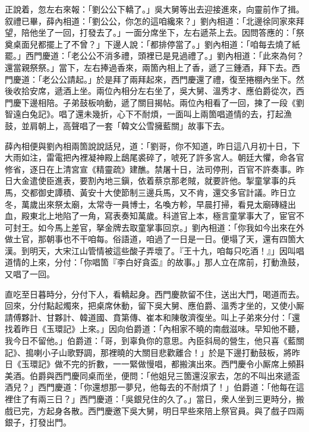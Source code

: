 正說着，忽左右來報：「劉公公下轎了。」吳大舅等出去迎接進來，向靈前作了揖。叙禮已畢，薛內相道：「劉公公，你怎的這咱纔來？」劉內相道：「北邊徐同家來拜望，陪他坐了一回，打發去了。」一面分席坐下，左右遞茶上去。因問答應的：「祭奠桌面兒都擺上了不曾？」下邊人說：「都排停當了。」劉內相道：「咱每去燒了紙罷。」西門慶道：「老公公不消多禮，頭裡已是見過禮了。」劉內相道：「此來為何？還當親祭祭。」當下，左右捧過香來，兩箇內相上了香，遞了三鍾酒，拜下去。西門慶道：「老公公請起。」於是拜了兩拜起來，西門慶還了禮，復至捲棚內坐下。然後收拾安席，遞酒上坐。兩位內相分左右坐了，吳大舅、溫秀才、應伯爵從次，西門慶下邊相陪。子弟鼓板响動，遞了關目揭帖。兩位內相看了一回，揀了一段《劉智遠白兔記》。唱了還未幾折，心下不耐煩，一面叫上兩箇唱道情的去，打起漁鼓，並肩朝上，高聲唱了一套「韓文公雪擁藍關」故事下去。

薛內相便與劉內相兩箇說說話兒，道：「劉哥，你不知道，昨日這八月初十日，下大雨如注，雷電把內裡凝神殿上鴟尾裘碎了，唬死了許多宮人。朝廷大懼，命各官修省，逐日在上清宮宣《精靈疏》建醮。禁屠十日，法司停刑，百官不許奏事。昨日大金遣使臣進表，要割內地三鎭，依着蔡京那老賊，{}就要許他。掣童掌事的兵馬，交都御史譚積、黃安十大使節制三邊兵馬，又不肯，還交多官計議。昨日立冬，萬歲出來祭太廟，太常寺一員博士，名喚方軫，早晨打掃，看見太廟磚縫出血，殿東北上地陷了一角，{}寫表奏知萬歲。科道官上本，極言童掌事大了，宦官不可封王。如今馬上差官，拏金牌去取童掌事回京。」劉內相道：「你我如今出來在外做土官，那朝事也不干咱每。俗語道，咱過了一日是一日。便塌了天，還有四箇大漢。到明天，大宋江山管情被這些酸子弄壞了。{}『王十九，咱每只吃酒！』」因叫唱道情的上來，分付：「你唱箇『李白好貪盃』的故事。」{}那人立在席前，打動漁鼓，又唱了一回。

直吃至日暮時分，分付下人，看轎起身。西門慶款留不住，送出大門，喝道而去。回來，分付點起燭來，把桌席休動，留下吳大舅、應伯爵、溫秀才坐的，又使小厮請傅夥計、甘夥計、韓道國、賁第傳、崔本和陳敬濟復坐。叫上子弟來分付：「還找着昨日《玉環記》上來。」因向伯爵道：「內相家不曉的南戲滋味。早知他不聽，我今日不留他。」伯爵道：「哥，到辜負你的意思。內臣斜局的營生，他只喜《藍關記》、搗喇小子山歌野調，那裡曉的大關目悲歡離合！」於是下邊打動鼓板，將昨日《玉環記》做不完的折數，一一緊做慢唱，都搬演出來。西門慶令小厮席上頻斟美酒。伯爵與西門慶同桌而坐，便問：「他姐兒三箇還沒家去，怎的不叫出來遞盃酒兒？」{}西門慶道：「你還想那一夢兒，他每去的不耐煩了！」伯爵道：「他每在這裡住了有兩三日？」西門慶道：「吳銀兒住的久了。」當日，衆人坐到三更時分，搬戲已完，方起身各散。西門慶邀下吳大舅，明日早些來陪上祭官員。與了戲子四兩銀子，打發出門。

